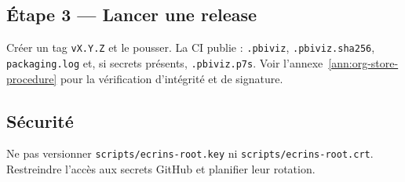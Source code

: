\subsection*{Étape 3 — Lancer une release}
Créer un tag \texttt{vX.Y.Z} et le pousser. La CI publie : \texttt{.pbiviz}, \texttt{.pbiviz.sha256}, \texttt{packaging.log} et, si secrets présents, \texttt{.pbiviz.p7s}. Voir l’annexe~\ref{ann:org-store-procedure} pour la vérification d’intégrité et de signature.

\subsection*{Sécurité}
Ne pas versionner \texttt{scripts/ecrins-root.key} ni \texttt{scripts/ecrins-root.crt}. Restreindre l’accès aux secrets GitHub et planifier leur rotation.
